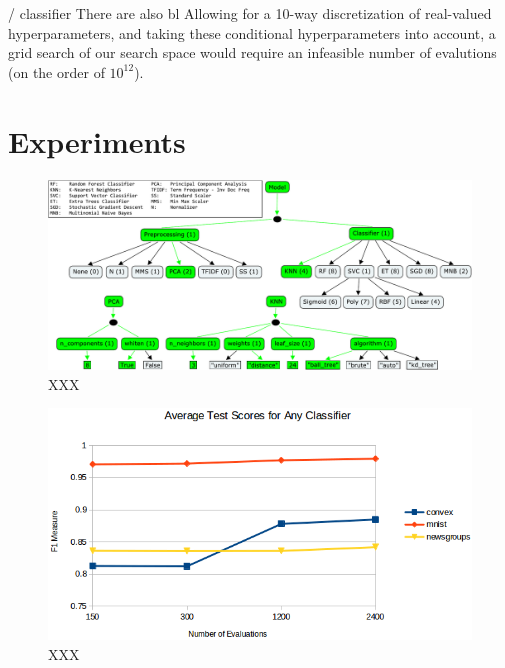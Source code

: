\documentclass[wcp]{jmlr}
\begin{document}
/ classifier
There are also bl
Allowing for a 10-way discretization of real-valued hyperparameters, and taking these conditional hyperparameters into account, a grid search of our search space would require an infeasible number of evalutions (on the order of $10^{12}$).



\section{Experiments}

\begin{figure}
    \centering
    \includegraphics[width=\textwidth]{graphics/sklearn_space_all_together}
    \caption{
	    XXX
    }
    \label{fig:boxplots}
\end{figure}

\begin{figure}
    \centering
    \includegraphics[width=\textwidth]{graphics/scores_by_classifier}
    \caption{
	    XXX
    }
    \label{fig:per_clf}
\end{figure}
\end{document}
